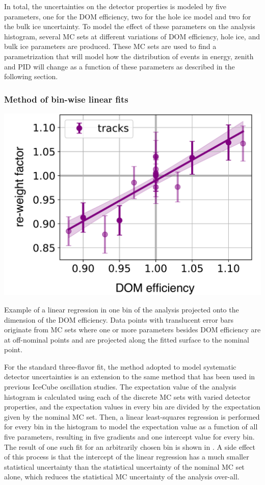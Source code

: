 In total, the uncertainties on the detector properties is modeled by five  parameters, one for the DOM efficiency, two for the hole ice model and two for the bulk ice uncertainty. To model the effect of these parameters on the analysis histogram, several MC sets at different variations of DOM efficiency, hole ice, and bulk ice parameters are produced. These MC sets are used to find a parametrization that will model how the distribution of events in energy, zenith and PID will change as a function of these parameters as described in the following section.

\subsubsection{Method of bin-wise linear fits}
\label{sec:hypersurfaces}
\begin{marginfigure}[\baselineskip]
    \includegraphics[width=\linewidth]{figures/measurement/systematics/detector/hypersurface_example_v2.pdf} 
    \caption{Example of a linear regression in one bin of the analysis projected onto the dimension of the DOM efficiency. Data points with translucent error bars originate from MC sets where one or more parameters besides DOM efficiency are at off-nominal points and are projected along the fitted surface to the nominal point.}
\end{marginfigure}
For the standard three-flavor fit, the method adopted to model systematic detector uncertainties is an extension to the same method that has been used in previous IceCube oscillation studies\cite{IceCube:2019dqi}. The expectation value of the analysis histogram is calculated using each of the discrete MC sets with varied detector properties, and the expectation values in every bin are divided by the expectation given by the nominal MC set. Then, a linear least-squares regression is performed for every bin in the histogram to model the expectation value as a function of all five parameters, resulting in five gradients and one intercept value for every bin. The result of one such fit for an arbitrarily chosen bin is shown in . A side effect of this process is that the intercept of the linear regression has a much smaller statistical uncertainty than the statistical uncertainty of the nominal MC set alone, which reduces the statistical MC uncertainty of the analysis over-all.

